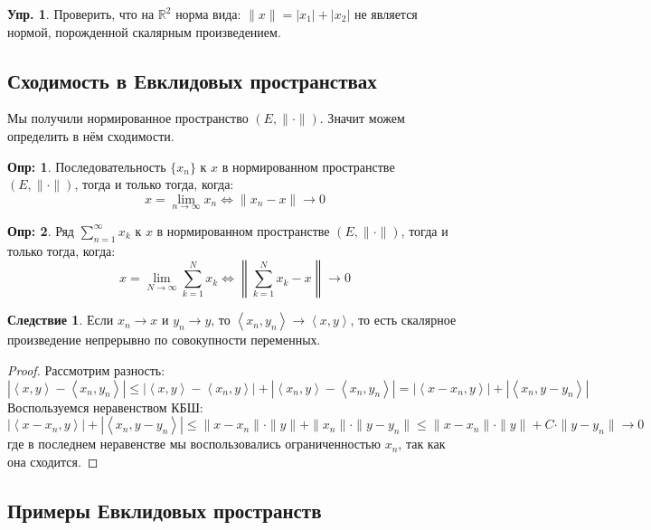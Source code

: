 \documentclass[12pt]{article}
\newcommand{\MR}{\mathbb{R}}
\theoremstyle{definition}
\newtheorem{defn}{Опр:}
\newtheorem{exrc}{Упр.}
\newtheorem{corollary}{Следствие}
\newcommand{\ddsum}[2]{\displaystyle\sum\limits_{#1}^{#2}}
\newcommand{\inner}[2]{\left\langle #1, #2 \right\rangle }
\begin{document}
\begin{exrc}
	Проверить, что на $\MR^2$ норма вида: $\|x\| = |x_1| + |x_2|$ не является нормой, порожденной скалярным произведением.
\end{exrc}

\newpage
\subsection*{Сходимость в Евклидовых пространствах}
Мы получили нормированное пространство $(E, \|\cdot\|)$. Значит можем определить в нём сходимости.
\begin{defn}
	Последовательность $\{x_n\}$  к $x$ в нормированном пространстве $(E,\|\cdot\|)$, тогда и только тогда, когда: 
	$$
		x = \lim\limits_{n \to \infty}x_n \Leftrightarrow \|x_n - x\| \to 0
	$$
\end{defn}
\begin{defn}
	Ряд $\ddsum{n = 1}{\infty}x_k$  к $x$ в нормированном пространстве $(E,\|\cdot\|)$, тогда и только тогда, когда: 
	$$
		x = \lim\limits_{N \to \infty}\ddsum{k = 1}{N}x_k \Leftrightarrow \left\|\ddsum{k = 1}{N}x_k - x\right\| \to 0
	$$
\end{defn}

\begin{corollary}
	Если $x_n \to x$ и $y_n \to y$, то $\inner{x_n}{y_n} \to \inner{x}{y}$, то есть скалярное произведение непрерывно по совокупности переменных.
\end{corollary}
\begin{proof}
	Рассмотрим разность:
	$$
		|\inner{x}{y} - \inner{x_n}{y_n}| \leq |\inner{x}{y} - \inner{x_n}{y}| + |\inner{x_n}{y} - \inner{x_n}{y_n}| = |\inner{x - x_n}{y}| + |\inner{x_n}{y - y_n}|
	$$
	Воспользуемся неравенством КБШ:
	$$
		|\inner{x - x_n}{y}| + |\inner{x_n}{y - y_n}| \leq \|x - x_n\|{\cdot}\|y\| + \|x_n\|{\cdot}\|y - y_n\| \leq \|x - x_n\|{\cdot}\|y\| + C{\cdot}\|y - y_n\| \to 0
	$$
	где в последнем неравенстве мы воспользовались ограниченностью $x_n$, так как она сходится.
\end{proof}

\subsection*{Примеры Евклидовых пространств}
\end{document}
